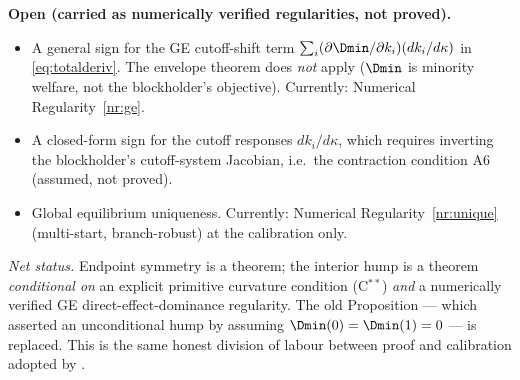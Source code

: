 \noindent\textbf{Open (carried as numerically verified regularities, not
proved).}
\begin{itemize}
\item A general sign for the GE cutoff-shift term $\sum_i
(\partial\Dmin/\partial k_i)(dk_i/d\kappa)$ in \eqref{eq:totalderiv}. The
envelope theorem does \emph{not} apply ($\Dmin$ is minority welfare, not the
blockholder's objective). Currently: Numerical Regularity~\ref{nr:ge}.
\item A closed-form sign for the cutoff responses $dk_i/d\kappa$, which
requires inverting the blockholder's cutoff-system Jacobian, i.e.\ the
contraction condition A6 (assumed, not proved).
\item Global equilibrium uniqueness. Currently: Numerical
Regularity~\ref{nr:unique} (multi-start, branch-robust) at the calibration
only.
\end{itemize}

\noindent\emph{Net status.} Endpoint symmetry is a theorem; the interior
hump is a theorem \emph{conditional on} an explicit primitive curvature
condition (C$^{\ast\ast}$) \emph{and} a numerically verified GE
direct-effect-dominance regularity. The old Proposition --- which asserted an
unconditional hump by assuming $\Dmin(0)=\Dmin(1)=0$ --- is replaced. This is
the same honest division of labour between proof and calibration adopted by
\citet{edmansGovernanceTrading2015}.
